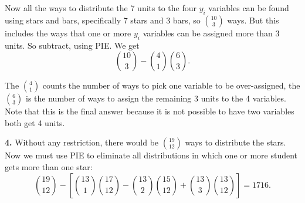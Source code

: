 \documentclass[10pt,]{book}
\theoremstyle{plain}
\theoremstyle{definition}
\theoremstyle{definition}
\theoremstyle{definition}
\numberwithin{equation}{chapter}
\begin{document}
            Now all the ways to distribute the 7 units to the four \(y_i\) variables can be found using stars and bars, specifically 7 stars and 3 bars,
            so \({10 \choose 3}\) ways. But this includes the ways that one or more \(y_i\) variables can be assigned more than 3 units. So subtract, using PIE. We get
            \begin{equation*}
              {10 \choose 3} - {4\choose 1} {6 \choose 3}.
            \end{equation*}
\par

            The \({4 \choose 1}\) counts the number of ways to pick one variable to be over-assigned, the \({6 \choose 3}\) is the number of ways to assign the remaining 3 units to the 4 variables.  Note that this is the final answer because it is not possible to have two variables both get 4 units.
\par\smallskip
\noindent\textbf{4.}\quad{}
            Without any restriction, there would be \({19\choose 12}\) ways to distribute the stars. Now we must use PIE to eliminate all distributions in which one or more student gets more than one star:
            \begin{equation*}
              {19 \choose 12} - \left[{13 \choose 1}{17 \choose 12} - {13\choose 2}{15 \choose 12} + {13\choose 3}{13 \choose 12}\right] = 1716.
            \end{equation*}
\par
\end{document}
